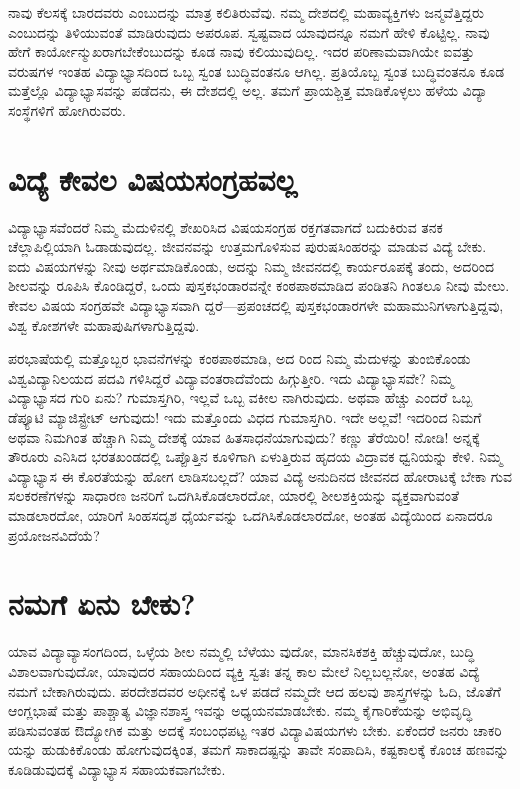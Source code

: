 ನಾವು ಕೆಲಸಕ್ಕೆ ಬಾರದವರು ಎಂಬುದನ್ನು ಮಾತ್ರ ಕಲಿತಿರುವೆವು. ನಮ್ಮ ದೇಶದಲ್ಲಿ ಮಹಾವ್ಯಕ್ತಿಗಳು ಜನ್ಮವೆತ್ತಿದ್ದರು ಎಂಬುದನ್ನು ತಿಳಿಯುವಂತೆ ಮಾಡಿರುವುದು ಅಪರೂಪ. ಸ್ವಷ್ಟವಾದ ಯಾವುದನ್ನೂ ನಮಗೆ ಹೇಳಿ ಕೊಟ್ಟಿಲ್ಲ. ನಾವು ಹೇಗೆ ಕಾರ್ಯೋನ್ಮುಖರಾಗಬೇಕೆಂಬುದನ್ನು ಕೂಡ ನಾವು ಕಲಿಯುವುದಿಲ್ಲ. ಇದರ ಪರಿಣಾಮವಾಗಿಯೇ ಐವತ್ತು ವರುಷಗಳ ಇಂತಹ ವಿದ್ಯಾಭ್ಯಾಸದಿಂದ ಒಬ್ಬ ಸ್ವಂತ ಬುದ್ಧಿವಂತನೂ ಆಗಿಲ್ಲ. ಪ್ರತಿಯೊಬ್ಬ ಸ್ವಂತ ಬುದ್ಧಿವಂತನೂ ಕೂಡ ಮತ್ತೆಲ್ಲೊ ವಿದ್ಯಾಭ್ಯಾಸವನ್ನು ಪಡೆದನು, ಈ ದೇಶದಲ್ಲಿ ಅಲ್ಲ. ತಮಗೆ ಪ್ರಾಯಶ್ಚಿತ್ತ ಮಾಡಿಕೊಳ್ಳಲು ಹಳೆಯ ವಿದ್ಯಾ ಸಂಸ್ಥೆಗಳಿಗೆ ಹೋಗಿರುವರು.


\section{ವಿದ್ಯೆ ಕೇವಲ ವಿಷಯಸಂಗ್ರಹವಲ್ಲ}

ವಿದ್ಯಾಭ್ಯಾಸವೆಂದರೆ ನಿಮ್ಮ ಮೆದುಳಿನಲ್ಲಿ ಶೇಖರಿಸಿದ ವಿಷಯಸಂಗ್ರಹ ರಕ್ತಗತವಾಗದೆ ಬದುಕಿರುವ ತನಕ ಚೆಲ್ಲಾಪಿಲ್ಲಿಯಾಗಿ ಓಡಾಡುವುದಲ್ಲ. ಜೀವನವನ್ನು ಉತ್ತಮಗೊಳಿಸುವ ಪುರುಷಸಿಂಹರನ್ನು ಮಾಡುವ ವಿದ್ಯೆ ಬೇಕು. ಐದು ವಿಷಯಗಳನ್ನು ನೀವು ಅರ್ಥಮಾಡಿಕೊಂಡು, ಅದನ್ನು ನಿಮ್ಮ ಜೀವನದಲ್ಲಿ ಕಾರ್ಯರೂಪಕ್ಕೆ ತಂದು, ಅದರಿಂದ ಶೀಲವನ್ನು ರೂಪಿಸಿ ಕೊಂಡಿದ್ದರೆ, ಒಂದು ಪುಸ್ತಕಭಂಡಾರವನ್ನೇ ಕಂಠಪಾಠಮಾಡಿದ ಪಂಡಿತನಿ ಗಿಂತಲೂ ನೀವು ಮೇಲು. ಕೇವಲ ವಿಷಯ ಸಂಗ್ರಹವೇ ವಿದ್ಯಾಭ್ಯಾಸವಾಗಿ ದ್ದರೆ—ಪ್ರಪಂಚದಲ್ಲಿ ಪುಸ್ತಕಭಂಡಾರಗಳೇ ಮಹಾಮುನಿಗಳಾಗುತ್ತಿದ್ದವು, ವಿಶ್ವ ಕೋಶಗಳೇ ಮಹಾಪುಷಿಗಳಾಗುತ್ತಿದ್ದವು.

ಪರಭಾಷೆಯಲ್ಲಿ ಮತ್ತೊಬ್ಬರ ಭಾವನೆಗಳನ್ನು ಕಂಠಪಾಠಮಾಡಿ, ಅದ ರಿಂದ ನಿಮ್ಮ ಮೆದುಳನ್ನು ತುಂಬಿಕೊಂಡು ವಿಶ್ವವಿದ್ಯಾನಿಲಯದ ಪದವಿ ಗಳಿಸಿದ್ದರೆ ವಿದ್ಯಾವಂತರಾದೆವೆಂದು ಹಿಗ್ಗುತ್ತೀರಿ. ಇದು ವಿದ್ಯಾಭ್ಯಾಸವೇ? ನಿಮ್ಮ ವಿದ್ಯಾಭ್ಯಾಸದ ಗುರಿ ಏನು? ಗುಮಾಸ್ತಗಿರಿ, ಇಲ್ಲವೆ ಒಬ್ಬ ವಕೀಲ ನಾಗಿರುವುದು. ಅಥವಾ ಹೆಚ್ಚು ಎಂದರೆ ಒಬ್ಬ ಡೆಪ್ಯೂಟಿ ಮ್ಯಾಜಿಸ್ಟ್ರೇಟ್ ಆಗುವುದು! ಇದು ಮತ್ತೊಂದು ವಿಧದ ಗುಮಾಸ್ತಗಿರಿ. ಇದೇ ಅಲ್ಲವೆ! ಇದರಿಂದ ನಿಮಗೆ ಅಥವಾ ನಿಮಗಿಂತ ಹೆಚ್ಚಾಗಿ ನಿಮ್ಮ ದೇಶಕ್ಕೆ ಯಾವ ಹಿತಸಾಧನೆಯಾಗುವುದು? ಕಣ್ಣು ತೆರೆಯಿರಿ! ನೋಡಿ! ಅನ್ನಕ್ಕೆ ತೌರೂರು ಎನಿಸಿದ ಭರತಖಂಡದಲ್ಲಿ ಒಪ್ಪೊತ್ತಿನ ಕೂಳಿಗಾಗಿ ಏಳುತ್ತಿರುವ ಹೃದಯ ವಿದ್ರಾವಕ ಧ್ವನಿಯನ್ನು ಕೇಳಿ. ನಿಮ್ಮ ವಿದ್ಯಾಭ್ಯಾಸ ಈ ಕೊರತೆಯನ್ನು ಹೋಗ ಲಾಡಿಸಬಲ್ಲದೆ? ಯಾವ ವಿದ್ಯೆ ಅನುದಿನದ ಜೀವನದ ಹೋರಾಟಕ್ಕೆ ಬೇಕಾ ಗುವ ಸಲಕರಣೆಗಳನ್ನು ಸಾಧಾರಣ ಜನರಿಗೆ ಒದಗಿಸಿಕೊಡಲಾರದೋ, ಯಾರಲ್ಲಿ ಶೀಲಶಕ್ತಿಯನ್ನು ವ್ಯಕ್ತವಾಗುವಂತೆ ಮಾಡಲಾರದೋ, ಯಾರಿಗೆ ಸಿಂಹಸದೃಶ ಧೈರ್ಯವನ್ನು ಒದಗಿಸಿಕೊಡಲಾರದೋ, ಅಂತಹ ವಿದ್ಯೆಯಿಂದ ಏನಾದರೂ ಪ್ರಯೋಜನವಿದೆಯೆ?


\section{ನಮಗೆ ಏನು ಬೇಕು?}

ಯಾವ ವಿದ್ಯಾವ್ಯಾಸಂಗದಿಂದ, ಒಳ್ಳೆಯ ಶೀಲ ನಮ್ಮಲ್ಲಿ ಬೆಳೆಯು ವುದೋ, ಮಾನಸಿಕಶಕ್ತಿ ಹೆಚ್ಚುವುದೋ, ಬುದ್ಧಿ ವಿಶಾಲವಾಗುವುದೋ, ಯಾವುದರ ಸಹಾಯದಿಂದ ವ್ಯಕ್ತಿ ಸ್ವತಃ ತನ್ನ ಕಾಲ ಮೇಲೆ ನಿಲ್ಲಬಲ್ಲನೋ, ಅಂತಹ ವಿದ್ಯೆ ನಮಗೆ ಬೇಕಾಗಿರುವುದು. ಪರದೇಶದವರ ಅಧೀನಕ್ಕೆ ಒಳ ಪಡದೆ ನಮ್ಮದೇ ಆದ ಹಲವು ಶಾಸ್ತ್ರಗಳನ್ನು ಓದಿ, ಜೊತೆಗೆ ಆಂಗ್ಲಭಾಷೆ ಮತ್ತು ಪಾಶ್ಚಾತ್ಯ ವಿಜ್ಞಾನಶಾಸ್ತ್ರ ಇವನ್ನು ಅಧ್ಯಯನಮಾಡಬೇಕು. ನಮ್ಮ ಕೈಗಾರಿಕೆಯನ್ನು ಅಭಿವೃದ್ಧಿ ಪಡಿಸುವಂತಹ ಔದ್ಯೋಗಿಕ ಮತ್ತು ಅದಕ್ಕೆ ಸಂಬಂಧಪಟ್ಟ ಇತರ ವಿದ್ಯಾವಿಷಯಗಳು ಬೇಕು. ಏಕೆಂದರೆ ಜನರು ಚಾಕರಿ ಯನ್ನು ಹುಡುಕಿಕೊಂಡು ಹೋಗುವುದಕ್ಕಿಂತ, ತಮಗೆ ಸಾಕಾದಷ್ಟನ್ನು ತಾವೇ ಸಂಪಾದಿಸಿ, ಕಷ್ಟಕಾಲಕ್ಕೆ ಕೊಂಚ ಹಣವನ್ನು ಕೂಡಿಡುವುದಕ್ಕೆ ವಿದ್ಯಾಭ್ಯಾಸ ಸಹಾಯಕವಾಗಬೇಕು.


